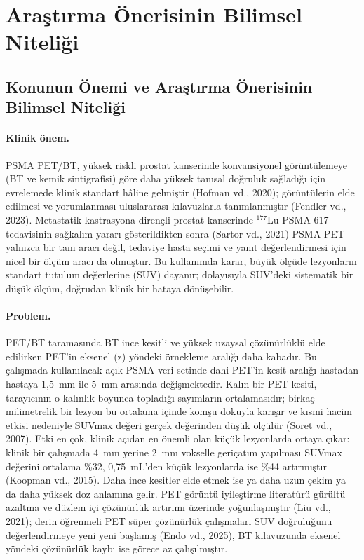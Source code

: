 \documentclass[11pt,a4paper]{article}
\begin{document}
\section{Araştırma Önerisinin Bilimsel Niteliği}

\subsection{Konunun Önemi ve Araştırma Önerisinin Bilimsel Niteliği}

\paragraph{Klinik önem.} PSMA PET/BT, yüksek riskli prostat kanserinde konvansiyonel
görüntülemeye (BT ve kemik sintigrafisi) göre daha yüksek tanısal doğruluk sağladığı için
evrelemede klinik standart hâline gelmiştir (Hofman vd., 2020); görüntülerin elde edilmesi ve
yorumlanması uluslararası kılavuzlarla tanımlanmıştır (Fendler vd., 2023). Metastatik
kastrasyona dirençli prostat kanserinde $^{177}$Lu-PSMA-617 tedavisinin sağkalım yararı
gösterildikten sonra (Sartor vd., 2021) PSMA PET yalnızca bir tanı aracı değil, tedaviye hasta
seçimi ve yanıt değerlendirmesi için nicel bir ölçüm aracı da olmuştur. Bu kullanımda karar,
büyük ölçüde lezyonların standart tutulum değerlerine (SUV) dayanır; dolayısıyla SUV'deki
sistematik bir düşük ölçüm, doğrudan klinik bir hataya dönüşebilir.

\paragraph{Problem.} PET/BT taramasında BT ince kesitli ve yüksek uzaysal çözünürlüklü elde
edilirken PET'in eksenel (z) yöndeki örnekleme aralığı daha kabadır. Bu çalışmada kullanılacak
açık PSMA veri setinde dahi PET'in kesit aralığı hastadan hastaya 1,5~mm ile 5~mm arasında
değişmektedir. Kalın bir PET kesiti, tarayıcının o kalınlık boyunca topladığı sayımların
ortalamasıdır; birkaç milimetrelik bir lezyon bu ortalama içinde komşu dokuyla karışır ve kısmi
hacim etkisi nedeniyle SUVmax değeri gerçek değerinden düşük ölçülür (Soret vd., 2007). Etki en
çok, klinik açıdan en önemli olan küçük lezyonlarda ortaya çıkar: klinik bir çalışmada 4~mm
yerine 2~mm vokselle geriçatım yapılması SUVmax değerini ortalama \%32, 0,75~mL'den küçük
lezyonlarda ise \%44 artırmıştır (Koopman vd., 2015). Daha ince kesitler elde etmek ise ya daha
uzun çekim ya da daha yüksek doz anlamına gelir. PET görüntü iyileştirme literatürü gürültü
azaltma ve düzlem içi çözünürlük artırımı üzerinde yoğunlaşmıştır (Liu vd., 2021); derin
öğrenmeli PET süper çözünürlük çalışmaları SUV doğruluğunu değerlendirmeye yeni yeni başlamış
(Endo vd., 2025), BT kılavuzunda eksenel yöndeki çözünürlük kaybı ise görece az çalışılmıştır.
\end{document}
